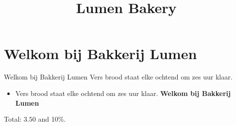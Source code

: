 \documentclass{article}
\title{Lumen Bakery}
\begin{document}
\maketitle
\section{Welkom bij Bakkerij Lumen}
Welkom bij Bakkerij Lumen
Vers brood staat elke ochtend om zes uur klaar.

\begin{itemize}
\item Vers brood staat elke ochtend om zes uur klaar. \textbf{Welkom bij Bakkerij Lumen}
\end{itemize}
Total: $3.50$ and 10\%.
\end{document}
